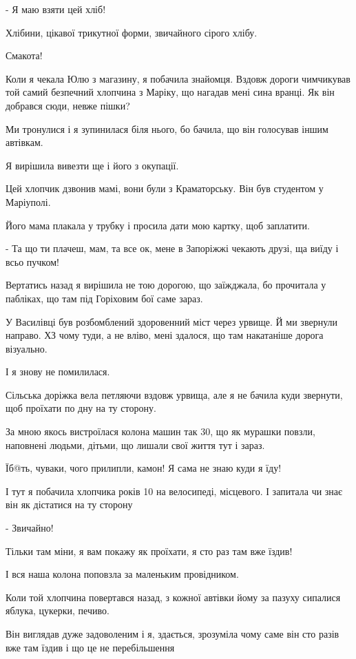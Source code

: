 
- Я маю взяти цей хліб!

Хлібини, цікавої трикутної форми, звичайного сірого хлібу.

 Смакота!

Коли я чекала Юлю з магазину, я побачила знайомця. Вздовж дороги чимчикував той
самий безпечний хлопчина з Маріку, що нагадав мені сина вранці. Як він добрався
сюди, невже пішки?

Ми тронулися і я зупинилася біля нього, бо бачила, що він голосував іншим
автівкам.

Я вирішила вивезти ще і його з окупації.

Цей хлопчик дзвонив мамі, вони були з Краматорську. Він був студентом у
Маріуполі.

Його мама плакала у трубку і просила дати мою картку, щоб заплатити.

- Та що ти плачеш, мам, та все ок, мене в Запоріжжі чекають друзі, ща виїду і
всьо пучком!

Вертатись назад я вирішила не тою дорогою, що заїжджала, бо прочитала у
пабліках, що там під Горіховим бої саме зараз. 

У Василівці був розбомблений здоровенний міст через урвище. Й ми звернули
направо. ХЗ чому туди, а не вліво, мені здалося, що там накатаніше дорога
візуально. 

І я знову не помилилася.

Сільська доріжка вела петляючи вздовж урвища, але я не бачила куди звернути,
щоб проїхати по дну на ту сторону.

За мною якось вистроїлася колона машин так 30, що як мурашки повзли, наповнені
людьми, дітьми, що лишали свої життя тут і зараз.

Їб@ть, чуваки, чого прилипли, камон! Я сама не знаю куди я їду!

І тут я побачила хлопчика років 10 на велосипеді,  місцевого. І запитала чи знає він як дістатися на ту сторону

- Звичайно!

Тільки там міни, я вам покажу як проїхати, я сто раз там вже їздив!

І вся наша колона поповзла за маленьким провідником.

Коли той хлопчина повертався назад, з кожної автівки йому за пазуху сипалися
яблука, цукерки, печиво.

Він виглядав дуже задоволеним і я, здається,  зрозуміла чому саме він сто разів
вже там їздив і що це не перебільшення

